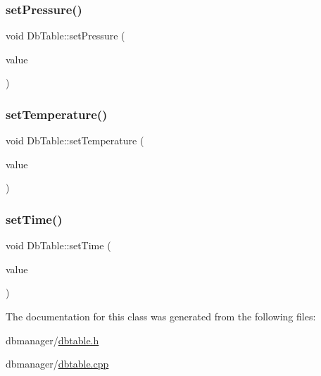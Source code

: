 \mbox{\label{class_db_table_a14639cd693e8f6e1d48c0d263535a355}} 
\subsubsection{\texorpdfstring{set\+Pressure()}{setPressure()}}
{\footnotesize\ttfamily void Db\+Table\+::set\+Pressure (\begin{DoxyParamCaption}\item[{const Q\+String \&}]{value }\end{DoxyParamCaption})}

\mbox{\label{class_db_table_acafd1019a86794179809e6a7b11d3c9f}} 
\subsubsection{\texorpdfstring{set\+Temperature()}{setTemperature()}}
{\footnotesize\ttfamily void Db\+Table\+::set\+Temperature (\begin{DoxyParamCaption}\item[{const Q\+String \&}]{value }\end{DoxyParamCaption})}

\mbox{\label{class_db_table_a671e83deaebb40c81ada2bb7a92002b0}} 
\subsubsection{\texorpdfstring{set\+Time()}{setTime()}}
{\footnotesize\ttfamily void Db\+Table\+::set\+Time (\begin{DoxyParamCaption}\item[{const Q\+String \&}]{value }\end{DoxyParamCaption})}



The documentation for this class was generated from the following files\+:\begin{DoxyCompactItemize}
\item 
dbmanager/\hyperlink{dbtable_8h}{dbtable.\+h}\item 
dbmanager/\hyperlink{dbtable_8cpp}{dbtable.\+cpp}\end{DoxyCompactItemize}
